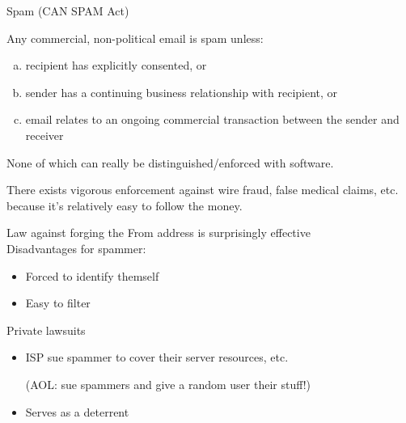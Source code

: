 \begin{definition}{Spam (CAN SPAM Act)}

Any commercial, non-political email is spam unless:
\begin{enumerate}[(a)]
    \item recipient has explicitly consented, or
    \item sender has a continuing business relationship with recipient, or
    \item email relates to an ongoing commercial transaction between the sender and receiver
\end{enumerate}
\end{definition}
None of which can really be distinguished/enforced with software.

There exists vigorous enforcement against wire fraud, false medical claims, etc. because it's relatively easy to follow
the money.

Law against forging the From address is surprisingly effective\\
Disadvantages for spammer:
\begin{itemize}
    \item Forced to identify themself
    \item Easy to filter
\end{itemize}

Private lawsuits
\begin{itemize}
    \item ISP sue spammer to cover their server resources, etc.

    (AOL: sue spammers and give a random user their stuff!)
    \item Serves as a deterrent
\end{itemize}

